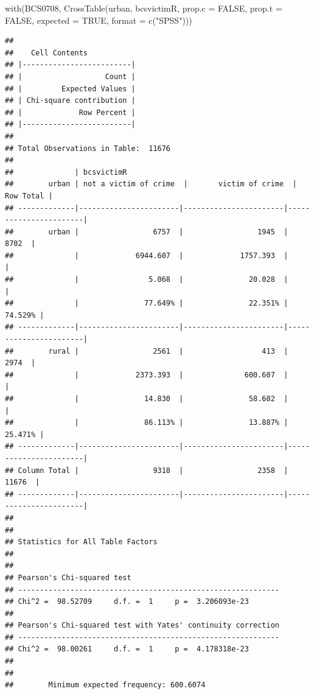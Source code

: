 \documentclass[
]{book}
\newenvironment{Shaded}{\begin{snugshade}}{\end{snugshade}}
\newcommand{\AttributeTok}[1]{\textcolor[rgb]{0.77,0.63,0.00}{#1}}
\newcommand{\ConstantTok}[1]{\textcolor[rgb]{0.00,0.00,0.00}{#1}}
\newcommand{\FunctionTok}[1]{\textcolor[rgb]{0.00,0.00,0.00}{#1}}
\newcommand{\NormalTok}[1]{#1}
\newcommand{\StringTok}[1]{\textcolor[rgb]{0.31,0.60,0.02}{#1}}
\begin{document}
\begin{Shaded}
\begin{Highlighting}[]
\FunctionTok{with}\NormalTok{(BCS0708, }\FunctionTok{CrossTable}\NormalTok{(urban, bcsvictimR, }\AttributeTok{prop.c =} \ConstantTok{FALSE}\NormalTok{, }\AttributeTok{prop.t =} \ConstantTok{FALSE}\NormalTok{, }\AttributeTok{expected =} \ConstantTok{TRUE}\NormalTok{, }\AttributeTok{format =} \FunctionTok{c}\NormalTok{(}\StringTok{"SPSS"}\NormalTok{)))}
\end{Highlighting}
\end{Shaded}

\begin{verbatim}
## 
##    Cell Contents
## |-------------------------|
## |                   Count |
## |         Expected Values |
## | Chi-square contribution |
## |             Row Percent |
## |-------------------------|
## 
## Total Observations in Table:  11676 
## 
##              | bcsvictimR 
##        urban | not a victim of crime  |       victim of crime  |             Row Total | 
## -------------|-----------------------|-----------------------|-----------------------|
##        urban |                 6757  |                 1945  |                 8702  | 
##              |             6944.607  |             1757.393  |                       | 
##              |                5.068  |               20.028  |                       | 
##              |               77.649% |               22.351% |               74.529% | 
## -------------|-----------------------|-----------------------|-----------------------|
##        rural |                 2561  |                  413  |                 2974  | 
##              |             2373.393  |              600.607  |                       | 
##              |               14.830  |               58.602  |                       | 
##              |               86.113% |               13.887% |               25.471% | 
## -------------|-----------------------|-----------------------|-----------------------|
## Column Total |                 9318  |                 2358  |                11676  | 
## -------------|-----------------------|-----------------------|-----------------------|
## 
##  
## Statistics for All Table Factors
## 
## 
## Pearson's Chi-squared test 
## ------------------------------------------------------------
## Chi^2 =  98.52709     d.f. =  1     p =  3.206093e-23 
## 
## Pearson's Chi-squared test with Yates' continuity correction 
## ------------------------------------------------------------
## Chi^2 =  98.00261     d.f. =  1     p =  4.178318e-23 
## 
##  
##        Minimum expected frequency: 600.6074
\end{verbatim}
\end{document}
